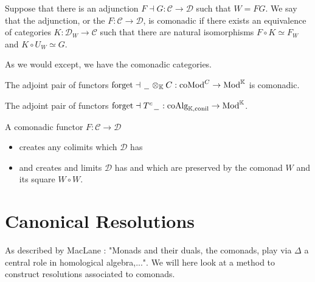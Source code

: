 \documentclass[../thesis.tex]{subfiles}
\begin{document}
    \begin{definition}[Comonadicity]
        Suppose that there is an adjunction $F \dashv G : \mathcal{C} \rightarrow \mathcal{D}$ such that $W = FG$. We say that the adjunction, or the $F : \mathcal{C} \rightarrow \mathcal{D}$, is comonadic if there exists an equivalence of categories $K : \mathcal{D}_W \rightarrow \mathcal{C}$ such that there are natural isomorphisms $F\circ K \simeq F_W$ and $K\circ U_W \simeq G$.
    \end{definition}

    As we would except, we have the comonadic categories.
    \begin{example}
        The adjoint pair of functors $\text{forget} \dashv \hspace{0.05cm}\underline{\hspace{0.2cm}}\hspace{0.05cm}\otimes_\mathbb{K} C : \text{coMod}^C \rightarrow \text{Mod}^\mathbb{K}$ is comonadic.
    \end{example}

    \begin{example}
        The adjoint pair of functors $\text{forget} \dashv T^c\hspace{0.05cm}\underline{\hspace{0.2cm}}\hspace{0.05cm} : \text{coAlg}_{\mathbb{K},\text{conil}} \rightarrow \text{Mod}^\mathbb{K}$.
    \end{example}

    \begin{thm}
        A comonadic functor $F : \mathcal{C} \rightarrow \mathcal{D}$
        \begin{itemize}
            \item creates any colimits which $\mathcal{D}$ has
            \item and creates and limits $\mathcal{D}$ has and which are preserved by the comonad $W$ and its square $W\circ W$.
        \end{itemize}
    \end{thm}

    \section{Canonical Resolutions}
        As described by MacLane \cite[180]{MacLane71}: "Monads and their duals, the comonads, play via $\Delta$ a central role in homological algebra,...". We will here look at a method to construct resolutions associated to comonads.
\end{document}

